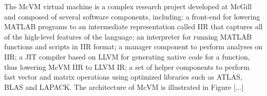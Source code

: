 The McVM virtual machine is a complex research project developed at McGill and composed of several software components, including: a front-end for lowering MATLAB programs to an intermediate representation called IIR that captures all of the high-level features of the language; an interpreter for running MATLAB functions and scripts in IIR format; a manager component to perform analyses on IIR; a JIT compiler based on LLVM for generating native code for a function, thus lowering McVM IIR to LLVM IR; a set of helper components to perform fast vector and matrix operations using optimized libraries such as ATLAS, BLAS and LAPACK. The architecture of McVM is illustrated in Figure [...]




  